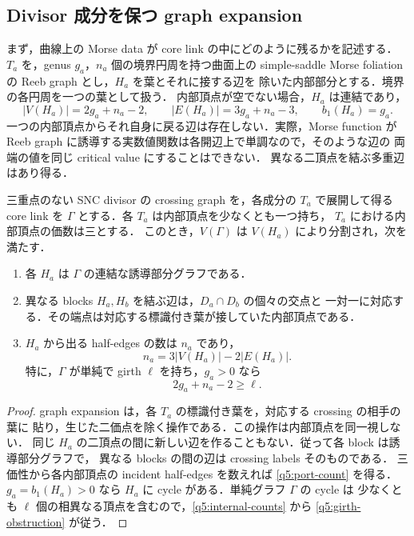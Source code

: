 \subsection{Divisor 成分を保つ graph expansion}

まず，曲線上の Morse data が core link の中にどのように残るかを記述する．
$T_a$ を，genus $g_a$，$n_a$ 個の境界円周を持つ曲面上の
simple-saddle Morse foliation の Reeb graph とし，$H_a$ を葉とそれに接する辺を
除いた内部部分とする．境界の各円周を一つの葉として扱う．
内部頂点が空でない場合，$H_a$ は連結であり，
\begin{equation}\label{q5:internal-counts}
 |V(H_a)|=2g_a+n_a-2,\qquad
 |E(H_a)|=3g_a+n_a-3,\qquad b_1(H_a)=g_a.
\end{equation}
一つの内部頂点からそれ自身に戻る辺は存在しない．実際，Morse function が
Reeb graph に誘導する実数値関数は各開辺上で単調なので，そのような辺の
両端の値を同じ critical value にすることはできない．
異なる二頂点を結ぶ多重辺はあり得る．

\begin{proposition}
\label{q5:induced-blocks}
三重点のない SNC divisor の crossing graph を，各成分の $T_a$ で展開して得る
core link を $\Gamma$ とする．各 $T_a$ は内部頂点を少なくとも一つ持ち，
$T_a$ における内部頂点の価数は三とする．
このとき，$V(\Gamma)$ は $V(H_a)$ により分割され，次を満たす．
\begin{enumerate}
\item 各 $H_a$ は $\Gamma$ の連結な誘導部分グラフである．
\item 異なる blocks $H_a,H_b$ を結ぶ辺は，$D_a\cap D_b$ の個々の交点と
一対一に対応する．その端点は対応する標識付き葉が接していた内部頂点である．
\item $H_a$ から出る half-edges の数は $n_a$ であり，
\begin{equation}\label{q5:port-count}
 n_a=3|V(H_a)|-2|E(H_a)|.
\end{equation}
特に，$\Gamma$ が単純で girth $\ell$ を持ち，$g_a>0$ なら
\begin{equation}\label{q5:girth-obstruction}
 2g_a+n_a-2\geq\ell.
\end{equation}
\end{enumerate}
\end{proposition}

\begin{proof}
graph expansion は，各 $T_a$ の標識付き葉を，対応する crossing の相手の葉に
貼り，生じた二価点を除く操作である．この操作は内部頂点を同一視しない．
同じ $H_a$ の二頂点の間に新しい辺を作ることもない．従って各 block は誘導部分グラフで，
異なる blocks の間の辺は crossing labels そのものである．
三価性から各内部頂点の incident half-edges を数えれば
\eqref{q5:port-count} を得る．
$g_a=b_1(H_a)>0$ なら $H_a$ に cycle がある．単純グラフ $\Gamma$ の cycle は
少なくとも $\ell$ 個の相異なる頂点を含むので，\eqref{q5:internal-counts} から
\eqref{q5:girth-obstruction} が従う．
\end{proof}

